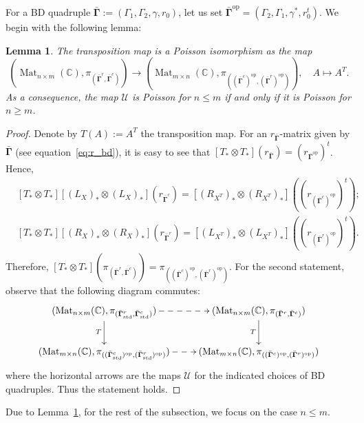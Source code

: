 \documentclass[11pt]{article}
\newcommand{\bbg}{\bar{\mathbf{\Gamma}}}
\newcommand{\std}{\mathrm{std}}
\newcommand{\op}{\mathrm{op}}
\DeclareMathOperator{\Mat}{Mat}
\newtheorem{lemma}[theorem]{Lemma}%
\theoremstyle{definition}\newtheorem{definition}[theorem]{Definition}
\theoremstyle{definition}\newtheorem{remark}[theorem]{Remark}
\theoremstyle{remark}
\numberwithin{equation}{section}
\begin{document}
For a BD quadruple $\bbg := (\Gamma_1,\Gamma_2,\gamma,r_0)$, let us set $\bbg^{\op}=(\Gamma_2,\Gamma_1,\gamma^*,r_0^t)$. We begin with the following lemma:
\begin{lemma}\label{l:nmPoiss}
    The transposition map is a Poisson isomorphism as the map
    \begin{equation*}
        (\Mat_{n\times m}(\mathbb{C}),\pi_{(\bbg^r,\bbg^c)}) \rightarrow (\Mat_{m\times n}(\mathbb{C}),\pi_{((\bbg^c)^{\op},(\bbg^r)^{\op})}), \quad A \mapsto A^T.
    \end{equation*}
    As a consequence, the map $\mathcal{U}$ is Poisson for $n \leq m$ if and only if it is Poisson for $n \geq m$.
\end{lemma}
\begin{proof}
    Denote by $T(A) := A^T$ the transposition map. For an $r_{\bbg}$-matrix given by $\bbg$ (see equation~\eqref{eq:r_bd}), it is easy to see that $[T_*\otimes T_*](r_{\bbg}) = (r_{\bbg^{\op}})^t$. Hence,
    \begin{align*}
        &[T_*\otimes T_*][(L_X)_*\otimes (L_X)_*](r_{\bbg^c}) = [(R_{X^T})_* \otimes (R_{X^T})_*]((r_{(\bbg^c)^{\op}})^t);\\
        &[T_*\otimes T_*][(R_X)_*\otimes (R_X)_*](r_{\bbg^r}) = [(L_{X^T})_*\otimes (L_{X^T})_*]((r_{(\bbg^r)^{\op}})^t).
    \end{align*}
    Therefore, $[T_*\otimes T_*](\pi_{(\bbg^r,\bbg^c)}) = \pi_{((\bbg^c)^{\op},(\bbg^r)^{\op})}$. For the second statement, observe that the following diagram commutes:
    \begin{equation*}
        \xymatrix{
            (\Mat_{n\times m}(\mathbb{C}),\pi_{(\bbg^r_{\std},\bbg^c_{\std})})\ar[d]_T \ar@{-->}[r] &(\Mat_{n\times m}(\mathbb{C}),\pi_{(\bbg^r,\bbg^c)})\ar[d]_{T}\\
            (\Mat_{m\times n}(\mathbb{C}),\pi_{((\bbg^c_{\std})^{\op},(\bbg^r_{\std})^{\op})}) \ar@{-->}[r] &(\Mat_{m\times n}(\mathbb{C}),\pi_{((\bbg^c)^{\op},(\bbg^r)^{\op})})
        }
    \end{equation*}
    where the horizontal arrows are the maps $\mathcal{U}$ for the indicated choices of BD quadruples. Thus the statement holds.
\end{proof}

Due to Lemma~\ref{l:nmPoiss}, for the rest of the subsection, we focus on the case $n \leq m$.
\end{document}
